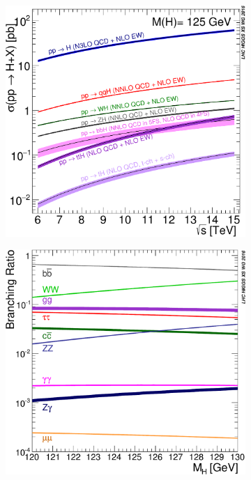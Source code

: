 \begin{figure}[htbp]
    \centering
    
    \begin{subfigure}[b]{0.46\textwidth}
        \centering
        \includegraphics[width=\linewidth]{images/higgs_prod.pdf}
        \caption{}
        \label{fig:higgs_comb:prod}
    \end{subfigure}
    \hfill
    \begin{subfigure}[b]{0.46\textwidth}
        \centering
        \includegraphics[width=\linewidth]{images/higgs_dec.pdf}
        \caption{}
        \label{fig:higgs_comb:dec}
    \end{subfigure}


\end{figure}
